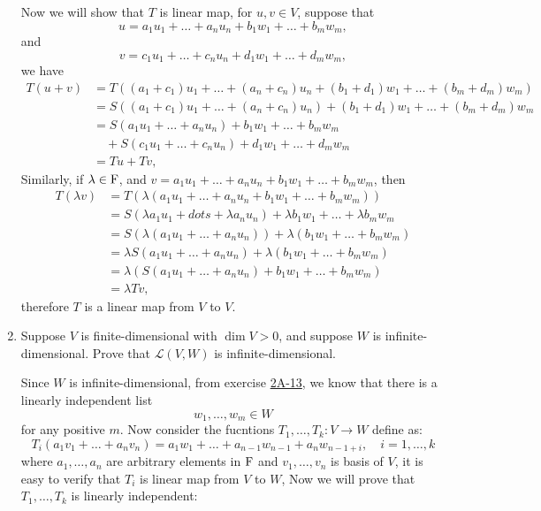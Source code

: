 \begin{enumerate}
\begin{solution}
            Now we will show that $T$ is linear map, for $u, v \in V$, suppose that 
            \[ u = a_1u_1 + \dots + a_nu_n + b_1w_1 + \dots + b_mw_m,\]
            and 
            \[ v = c_1u_1 + \dots + c_nu_n + d_1w_1 + \dots + d_mw_m,\]
            we have 
            \begin{align*}
                T(u+v) &= T\left((a_1+c_1)u_1 + \dots + (a_n+c_n)u_n + (b_1+d_1)w_1 + \dots + (b_m+d_m)w_m\right) \\
                       &= S\left((a_1+c_1)u_1 + \dots + (a_n+c_n)u_n \right) + (b_1+d_1)w_1 + \dots + (b_m+d_m)w_m \\
                       &= S(a_1u_1 + \dots + a_nu_n) + b_1w_1 + \dots + b_mw_m \\
                       &\quad + S(c_1u_1 + \dots + c_nu_n) + d_1w_1 + \dots + d_mw_m \\
                       &= Tu + Tv,
            \end{align*}
            Similarly, if $\lambda \in \mathrm{F}$, and $v = a_1u_1 + \ldots + a_nu_n + b_1w_1 + \dots + b_mw_m$, then 
            \begin{align*}
                T(\lambda v) &= T\left(\lambda (a_1u_1 + \ldots + a_nu_n + b_1w_1 + \dots + b_mw_m)\right) \\
                             &= S(\lambda a_1u_1 + dots + \lambda a_nu_n) + \lambda b_1w_1 + \dots + \lambda b_m w_m \\
                             &= S\left(\lambda (a_1u_1 + \dots + a_nu_n)\right) + \lambda (b_1w_1 + \dots + b_mw_m) \\
                             &= \lambda S(a_1u_1 + \dots + a_nu_n) + \lambda (b_1w_1 + \dots + b_mw_m) \\
                             &= \lambda \left( S(a_1u_1 + \dots + a_nu_n) + b_1w_1 + \dots + b_mw_m \right) \\
                             &= \lambda Tv,
            \end{align*}
            therefore $T$ is a linear map from $V$ to $V$.
        \end{solution}
    \item Suppose $V$ is finite-dimensional with $\dim{V} >0$, and suppose $W$ is infinite-dimensional. Prove that $\mathcal{L}(V,W)$ is infinite-dimensional.
        \begin{solution}
            Since $W$ is infinite-dimensional, from exercise \hyperlink{2A-13}{2A-13}, we know that there is a linearly independent list 
            \[ w_1, \ldots, w_m \in W\] 
            for any positive $m$. Now consider the fucntions $T_1, \ldots, T_k: V \to W$ define as:
            \[ T_i(a_1v_1 + \ldots + a_nv_n) = a_1w_1 + \dots + a_{n-1}w_{n-1} + a_nw_{n-1+i}, \quad i=1,\ldots, k\]
            where $a_1,\ldots,a_n$ are arbitrary elements in $\mathrm{F}$ and $v_1, \ldots, v_n$ is basis of $V$, it is easy to verify that $T_i$ is linear map 
            from $V$ to $W$, Now we will prove that $T_1, \ldots, T_k$ is linearly independent:


\end{solution}
\end{enumerate}
